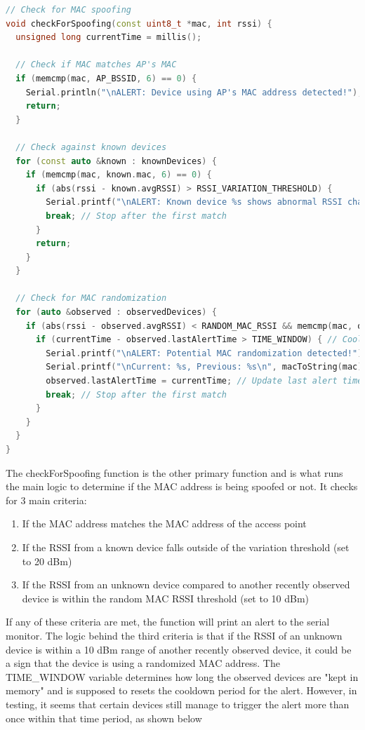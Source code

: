 \documentclass[letterpaper, 11pt]{article}
\begin{document}
\newpage
\begin{lstlisting}[language=C++, caption=Spoof Detection, label=lst:spoof detector]
// Check for MAC spoofing
void checkForSpoofing(const uint8_t *mac, int rssi) {
  unsigned long currentTime = millis();

  // Check if MAC matches AP's MAC
  if (memcmp(mac, AP_BSSID, 6) == 0) {
    Serial.println("\nALERT: Device using AP's MAC address detected!");
    return;
  }

  // Check against known devices
  for (const auto &known : knownDevices) {
    if (memcmp(mac, known.mac, 6) == 0) {
      if (abs(rssi - known.avgRSSI) > RSSI_VARIATION_THRESHOLD) {
        Serial.printf("\nALERT: Known device %s shows abnormal RSSI change! Current RSSI: %d dBm, Known Avg RSSI: %d dBm", macToString(mac).c_str(), rssi, known.avgRSSI);
        break; // Stop after the first match
      }
      return;
    }
  }

  // Check for MAC randomization
  for (auto &observed : observedDevices) {
    if (abs(rssi - observed.avgRSSI) < RANDOM_MAC_RSSI && memcmp(mac, observed.mac, 6) != 0 && (currentTime - observed.lastSeen) < TIME_WINDOW) {
      if (currentTime - observed.lastAlertTime > TIME_WINDOW) { // Cooldown check
        Serial.printf("\nALERT: Potential MAC randomization detected!");
        Serial.printf("\nCurrent: %s, Previous: %s\n", macToString(mac).c_str(), macToString(observed.mac).c_str());
        observed.lastAlertTime = currentTime; // Update last alert time
        break; // Stop after the first match
      }
    }
  }
}
\end{lstlisting}
The checkForSpoofing function is the other primary function and is what runs the main logic to determine if the MAC address is being spoofed or not. It checks for 3 main criteria:
\begin{enumerate}
    \item If the MAC address matches the MAC address of the access point
    \item If the RSSI from a known device falls outside of the variation threshold (set to 20 dBm)
    \item If the RSSI from an unknown device compared to another recently observed device is within the random MAC RSSI threshold (set to 10 dBm) 
\end{enumerate}
If any of these criteria are met, the function will print an alert to the serial monitor. The logic behind the third criteria is that if the RSSI of an unknown device is within a 10 dBm range
of another recently observed device, it could be a sign that the device is using a randomized MAC address. The TIME\_WINDOW variable determines how long the observed devices are "kept in memory" 
and is supposed to resets the cooldown period for the alert. However, in testing, it seems that certain devices still manage to trigger the alert more than once within that time period, as shown below 
\end{document}
